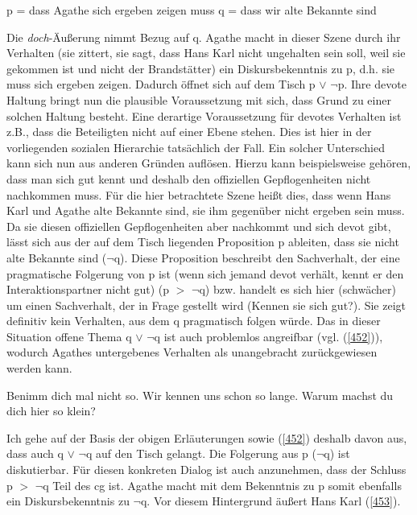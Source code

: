 \begin{exe}
	\ex\label{451} 
	\begin{xlist}
		\ex\label{451a} p = dass Agathe sich ergeben zeigen muss
 		\ex\label{451b}	q = dass wir alte Bekannte sind	
 	\end{xlist}	
\end{exe}		
Die \textit{doch}-Äußerung nimmt Bezug auf q. Agathe macht in dieser Szene durch ihr Verhalten (sie zittert, sie sagt, dass Hans Karl nicht ungehalten sein soll, weil sie gekommen ist und nicht der Brandstätter) ein Diskursbekenntnis zu p, d.h. sie muss sich ergeben zeigen. Dadurch öffnet sich auf dem Tisch p $\vee$ $\neg$p. Ihre devote Haltung bringt nun die plausible Voraussetzung mit sich, dass Grund zu einer solchen Haltung besteht. Eine derartige Voraussetzung für devotes Verhalten ist z.B., dass die Beteiligten nicht auf einer Ebene stehen. Dies ist hier in der vorliegenden sozialen Hierarchie tatsächlich der Fall. Ein solcher Unterschied kann sich nun aus anderen Gründen auflösen. Hierzu kann beispielsweise gehören, dass man sich gut kennt und deshalb den offiziellen Gepflogenheiten nicht nachkommen muss. Für die hier betrachtete Szene heißt dies, dass wenn Hans Karl und Agathe alte Bekannte sind, sie ihm gegenüber nicht ergeben sein muss. Da sie diesen offiziellen Gepflogenheiten aber nachkommt und sich devot gibt, lässt sich aus der auf dem Tisch liegenden Proposition p ableiten, dass sie nicht alte Bekannte sind ($\neg$q). Diese Proposition beschreibt den Sachverhalt, der eine pragmatische Folgerung von p ist (wenn sich jemand devot verhält, kennt er den Interaktionspartner nicht gut) (p $>$ $\neg$q) bzw. handelt es sich hier (schwächer) um einen Sachverhalt, der in Frage gestellt wird (Kennen sie sich gut?). Sie zeigt definitiv kein Verhalten, aus dem q pragmatisch folgen würde. Das in dieser Situation offene Thema q $\vee$ $\neg$q ist auch problemlos angreifbar (vgl. (\ref{452})), wodurch Agathes untergebenes Verhalten als unangebracht zurückgewiesen werden kann.

\begin{exe}
	\ex\label{452} 
	Benimm dich mal nicht so. Wir kennen uns schon so lange. Warum machst du dich hier so klein?
\end{exe}
Ich gehe auf der Basis der obigen Erläuterungen sowie (\ref{452}) deshalb davon aus, dass auch q $\vee$ $\neg$q auf den Tisch gelangt. Die Folgerung aus p ($\neg$q) ist diskutierbar. Für diesen konkreten Dialog ist auch anzunehmen, dass der Schluss p $>$ $\neg$q Teil des cg ist. Agathe macht mit dem Bekenntnis zu p somit ebenfalls ein Diskursbekenntnis zu $\neg$q. Vor diesem Hintergrund äußert Hans Karl (\ref{453}).

